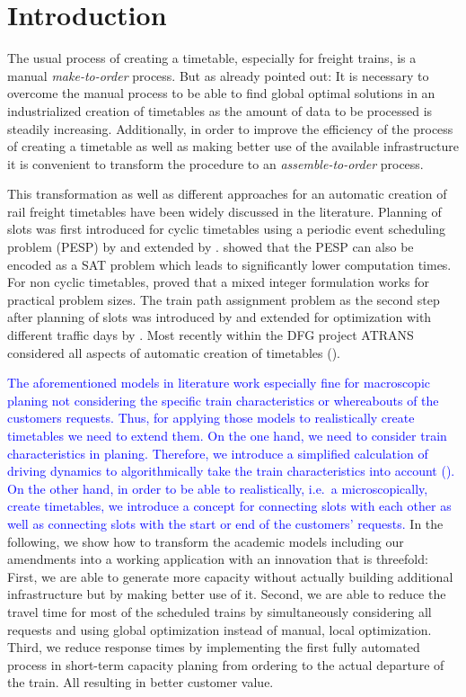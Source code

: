 \section{Introduction}
\label{chap:intro}
%
The usual process of creating a timetable, especially for freight trains, is a manual \emph{make-to-order} process. But as \cite{FP:2014} already pointed out: It is necessary to overcome the manual process to be able to find global optimal solutions in an industrialized creation of timetables as the amount of data to be processed is steadily increasing. Additionally, in order to improve the efficiency of the process of creating a timetable as well as making better use of the available infrastructure it is convenient to transform the procedure to an \emph{assemble-to-order} process.

This transformation as well as different approaches for an automatic creation of rail freight timetables have been widely discussed in the literature. Planning of slots was first introduced for cyclic timetables using a periodic event scheduling problem (PESP) by \cite{N:1998} and extended by \cite{O:2009}. \cite{G:2012} showed that the PESP can also be encoded as a SAT problem which leads to significantly lower computation times. For non cyclic timetables, \cite{G:2013} proved that a mixed integer formulation works for practical problem sizes. The train path assignment problem as the second step after planning of slots was introduced by \cite{NO:2014} and extended for optimization with different traffic days by \cite{N:2015}. Most recently within the DFG project ATRANS considered all aspects of automatic creation of timetables (\cite{CS, XL, RW}).

\textcolor{blue}{The aforementioned models in literature work especially fine for macroscopic planing not considering the specific train characteristics or whereabouts of the customers requests. Thus, for applying those models to realistically create timetables we need to extend them. On the one hand, we need to consider train characteristics in planing. Therefore, we introduce a simplified calculation of driving dynamics to algorithmically take the train characteristics into account (\cite{KP}). On the other hand, in order to be able to realistically, i.e.\ a microscopically, create timetables, we introduce a concept for connecting slots with each other as well as connecting slots with the start or end of the customers' requests.}
In the following, we show how to transform the academic models including our amendments into a working application with an innovation that is threefold:
First, we are able to generate more capacity without actually building additional infrastructure but by making better use of it. Second, we are able to reduce the travel time for most of the scheduled trains by simultaneously considering all requests and using global optimization instead of manual, local optimization. Third, we reduce response times by implementing the first fully automated process in short-term capacity planing from ordering to the actual departure of the train. All resulting in better customer value.

